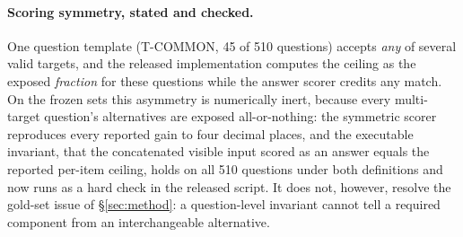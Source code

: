 \documentclass[10pt,twocolumn]{article}
\begin{document}
\paragraph{Scoring symmetry, stated and checked.} One question template (T-COMMON, 45 of 510 questions) accepts \emph{any} of several valid targets, and the released implementation computes the ceiling as the exposed \emph{fraction} for these questions while the answer scorer credits any match. On the frozen sets this asymmetry is numerically inert, because every multi-target question's alternatives are exposed all-or-nothing: the symmetric scorer reproduces every reported gain to four decimal places, and the executable invariant, that the concatenated visible input scored as an answer equals the reported per-item ceiling, holds on all 510 questions under both definitions and now runs as a hard check in the released script. It does not, however, resolve the gold-set issue of \S\ref{sec:method}: a question-level invariant cannot tell a required component from an interchangeable alternative.
\end{document}
